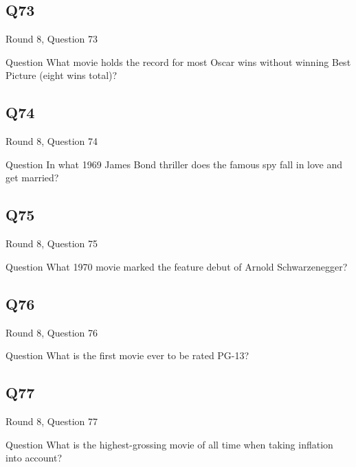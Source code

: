 \documentclass[11pt]{beamer}
\begin{document}
\subsection*{Q73}
\begin{frame}[t]{Round 8, Question 73}
\vspace{2em}
\begin{block}{Question}
What movie holds the record for most Oscar wins without winning Best Picture (eight wins total)?
\end{block}
\end{frame}
    

\subsection*{Q74}
\begin{frame}[t]{Round 8, Question 74}
\vspace{2em}
\begin{block}{Question}
In what 1969 James Bond thriller does the famous spy fall in love and get married?
\end{block}
\end{frame}
    

\subsection*{Q75}
\begin{frame}[t]{Round 8, Question 75}
\vspace{2em}
\begin{block}{Question}
What 1970 movie marked the feature debut of Arnold Schwarzenegger?
\end{block}
\end{frame}
    

\subsection*{Q76}
\begin{frame}[t]{Round 8, Question 76}
\vspace{2em}
\begin{block}{Question}
What is the first movie ever to be rated PG-13?
\end{block}
\end{frame}
    

\subsection*{Q77}
\begin{frame}[t]{Round 8, Question 77}
\vspace{2em}
\begin{block}{Question}
What is the highest-grossing movie of all time when taking inflation into account?
\end{block}
\end{frame}
    
\end{document}
